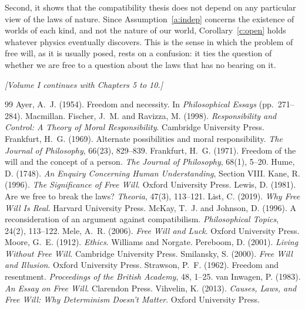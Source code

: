 \documentclass{situationist-preprint}
\begin{document}
Second, it shows that the compatibility thesis does not depend on any particular view of the laws of nature. Since Assumption~\ref{a:indep} concerns the existence of worlds of each kind, and not the nature of our world, Corollary~\ref{c:open} holds whatever physics eventually discovers. This is the sense in which the problem of free will, as it is usually posed, rests on a confusion: it ties the question of whether we are free to a question about the laws that has no bearing on it.

\bigskip
\begin{center}\small\itshape [Volume I continues with Chapters 5 to 10.]\end{center}

\begin{thebibliography}{99}\small
{} Ayer, A.~J. (1954). Freedom and necessity. In \emph{Philosophical Essays} (pp.~271--284). Macmillan.
 Fischer, J.~M. and Ravizza, M. (1998). \emph{Responsibility and Control: A Theory of Moral Responsibility}. Cambridge University Press.
 Frankfurt, H.~G. (1969). Alternate possibilities and moral responsibility. \emph{The Journal of Philosophy}, 66(23), 829--839.
 Frankfurt, H.~G. (1971). Freedom of the will and the concept of a person. \emph{The Journal of Philosophy}, 68(1), 5--20.
 Hume, D. (1748). \emph{An Enquiry Concerning Human Understanding}, Section VIII.
 Kane, R. (1996). \emph{The Significance of Free Will}. Oxford University Press.
 Lewis, D. (1981). Are we free to break the laws? \emph{Theoria}, 47(3), 113--121.
 List, C. (2019). \emph{Why Free Will Is Real}. Harvard University Press.
 McKay, T.~J. and Johnson, D. (1996). A reconsideration of an argument against compatibilism. \emph{Philosophical Topics}, 24(2), 113--122.
 Mele, A.~R. (2006). \emph{Free Will and Luck}. Oxford University Press.
 Moore, G.~E. (1912). \emph{Ethics}. Williams and Norgate.
 Pereboom, D. (2001). \emph{Living Without Free Will}. Cambridge University Press.
 Smilansky, S. (2000). \emph{Free Will and Illusion}. Oxford University Press.
 Strawson, P.~F. (1962). Freedom and resentment. \emph{Proceedings of the British Academy}, 48, 1--25.
 van Inwagen, P. (1983). \emph{An Essay on Free Will}. Clarendon Press.
 Vihvelin, K. (2013). \emph{Causes, Laws, and Free Will: Why Determinism Doesn't Matter}. Oxford University Press.
\end{thebibliography}
\end{document}
